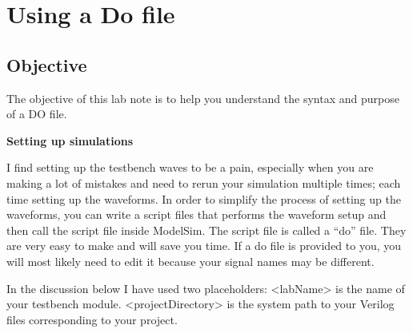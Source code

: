 \chapter{Using a Do file}
\graphicspath{ {./Lab00HowTo/howTo30 Using Do Files/Fig} }


\hypertarget{objective}{%
\section{\texorpdfstring{Objective }{Objective }}\label{objective}}

The objective of this lab note is to help you understand the syntax and
purpose of a DO file.

\textbf{Setting up simulations}

I find setting up the testbench waves to be a pain, especially when you
are making a lot of mistakes and need to rerun your simulation multiple
times; each time setting up the waveforms. In order to simplify the
process of setting up the waveforms, you can write a script files that
performs the waveform setup and then call the script file inside
ModelSim. The script file is called a ``do'' file. They are very easy to
make and will save you time. If a do file is provided to you, you will
most likely need to edit it because your signal names may be different.

In the discussion below I have used two placeholders:
\textless labName\textgreater{} is the name of your testbench module.
\textless projectDirectory\textgreater{} is the system path to your
Verilog files corresponding to your project.

